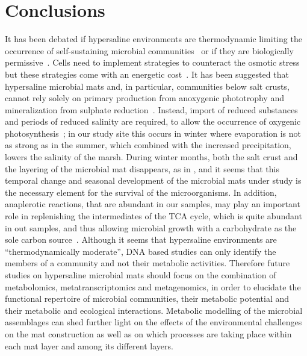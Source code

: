 \section{Conclusions}
\label{swamp:concl}

   It has been debated if hypersaline environments are thermodynamic limiting the occurrence of self-sustaining 
   microbial communities~\citep{oren_thermodynamic_2011} or if they are 
   biologically permissive~\citep{lee_nacl-saturated_2018}. 
   Cells need to implement strategies to counteract the osmotic stress~\citep{gunde-cimerman_strategies_2018} 
   but these strategies come with an energetic cost~\citep{meier_limitation_2021}. 
   It has been suggested that hypersaline microbial mats and, in particular, communities below salt crusts, 
   cannot rely solely on primary production from anoxygenic phototrophy and mineralization from sulphate reduction~\citep{meier_limitation_2021}. 
   Instead, import of reduced substances and periods of reduced salinity are required, 
   to allow the occurrence of oxygenic photosynthesis~\citep{meier_limitation_2021}; 
   in our study site this occurs in winter where evaporation is not as strong as in the summer, 
   which combined with the increased precipitation, lowers the salinity of the marsh. 
   During winter months, both the salt crust and the layering of the microbial mat disappears, as in \cite{cardoso_seasonal_2019}, 
   and it seems that this temporal change and seasonal development of the microbial mats under study is the necessary element for the survival of the microorganisms. 
   In addition, anaplerotic reactions, that are abundant in our samples, may play an important role in replenishing the intermediates of the TCA cycle, 
   which is quite abundant in out samples, and thus allowing microbial growth with a carbohydrate 
   as the sole carbon source~\citep{tong_structure_2013, choi_distinct_2016}. 
   Although it seems that hypersaline environments are “thermodynamically moderate”, DNA based studies can only identify 
   the members of a community and not their metabolic activities. 
   Therefore future studies on hypersaline microbial mats should focus on the combination of metabolomics, 
   metatranscriptomics and metagenomics, in order to elucidate the functional repertoire of microbial communities, 
   their metabolic potential and their metabolic and ecological interactions. 
   Metabolic modelling of the microbial assemblages can shed further light on the effects of the environmental 
   challenges on the mat construction as well as on which processes are taking place within each mat layer and 
   among its different layers.


